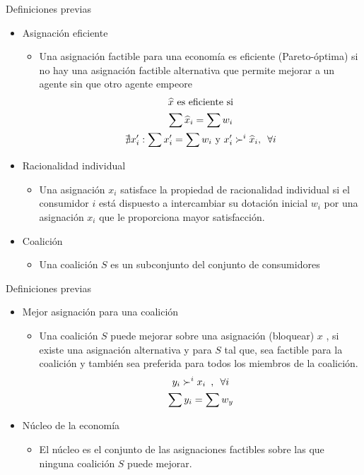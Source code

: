 \begin{frame}{Definiciones previas}
	\begin{itemize}
		\item Asignación eficiente
			\begin{itemize}
				\item Una asignación factible para una economía es eficiente (Pareto-óptima) si no hay una asignación factible alternativa que permite mejorar a un agente sin que otro agente empeore
					\begin{gather*}
						\widehat{x} \text{ es eficiente si} \\
						\sum \widehat{x}_i = \sum w_i \\
						\nexists x_{i}^{\prime} : \sum x_{i}^{\prime} = \sum w_i \text{ y } x_{i}^{\prime} \succ^{i} \widehat{x}_i,\enskip \forall i
					\end{gather*}
			\end{itemize}
		\item Racionalidad individual
			\begin{itemize}
				\item Una asignación $x_i$ satisface la propiedad de racionalidad individual si el consumidor $i$ está dispuesto a intercambiar su dotación inicial $w_i$ por una asignación $x_i$ que le proporciona mayor satisfacción.
			\end{itemize}
		\item Coalición
			\begin{itemize}
				\item Una coalición $S$ es un subconjunto del conjunto de consumidores
			\end{itemize}
	\end{itemize}
\end{frame}
\begin{frame}{Definiciones previas}
	\begin{itemize}
		\item Mejor asignación para una coalición
			\begin{itemize}
				\item Una coalición $S$ puede mejorar sobre una asignación (bloquear) $x$ , si existe una asignación alternativa y para $S$ tal que, sea factible para la coalición y también sea preferida para todos los miembros de la coalición.
					\begin{gather*}
						y_i \succ^{i} x_i \enskip , \enskip \forall i\\
						\sum y_i = \sum w_{y}
					\end{gather*}
			\end{itemize}
		\item Núcleo de la economía
			\begin{itemize}
				\item El núcleo es el conjunto de las asignaciones factibles sobre las que ninguna coalición $S$ puede mejorar.
			\end{itemize}
	\end{itemize}
\end{frame}
